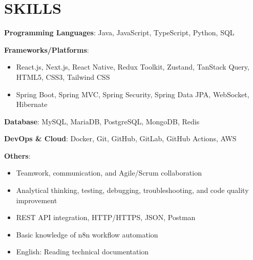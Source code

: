 \section{SKILLS}
\resumeSubHeadingListStart

  \item
    \resumeItemListStart
      \item \textbf{Programming Languages}: Java, JavaScript, TypeScript, Python, SQL
      \item \textbf{Frameworks/Platforms}:
        \begin{itemize}
          \item React.js, Next.js, React Native, Redux Toolkit, Zustand, TanStack Query, HTML5, CSS3, Tailwind CSS
          \item Spring Boot, Spring MVC, Spring Security, Spring Data JPA, WebSocket, Hibernate
        \end{itemize}
      \item \textbf{Database}: MySQL, MariaDB, PostgreSQL, MongoDB, Redis
      \item \textbf{DevOps \& Cloud}: Docker, Git, GitHub, GitLab, GitHub Actions, AWS
      \item \textbf{Others}:
        \begin{itemize}
          \item Teamwork, communication, and Agile/Scrum collaboration
          \item Analytical thinking, testing, debugging, troubleshooting, and code quality improvement
          \item REST API integration, HTTP/HTTPS, JSON, Postman
          \item Basic knowledge of n8n workflow automation
          \item English: Reading technical documentation
        \end{itemize}
    \resumeItemListEnd

\resumeSubHeadingListEnd

